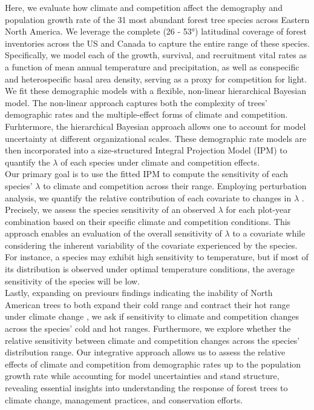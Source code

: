 Here, we evaluate how climate and competition affect the demography and
population growth rate of the 31 most abundant forest tree species
across Eastern North America. We leverage the complete (26 - 53°)
latitudinal coverage of forest inventories across the US and Canada to
capture the entire range of these species. Specifically, we model each
of the growth, survival, and recruitment vital rates as a function of
mean annual temperature and precipitation, as well as conspecific and
heterospecific basal area density, serving as a proxy for competition
for light. We fit these demographic models with a flexible, non-linear
hierarchical Bayesian model. The non-linear approach captures both the
complexity of trees' demographic rates and the multiple-effect forms of
climate and competition. Furhtermore, the hierarchical Bayesian approach
allows one to account for model uncertainty at different organizational
scales. These demographic rate models are then incorporated into a
size-structured Integral Projection Model (IPM) to quantify the
\(\lambda\) of each species under climate and competition effects.\\

Our primary goal is to use the fitted IPM to compute the sensitivity of
each species' \(\lambda\) to climate and competition across their range.
Employing perturbation analysis, we quantify the relative contribution
of each covariate to changes in \(\lambda\) \citep{Caswell2000}.
Precisely, we assess the species sensitivity of an observed \(\lambda\)
for each plot-year combination based on their specific climate and
competition conditions. This approach enables an evaluation of the
overall sensitivity of \(\lambda\) to a covariate while considering the
inherent variability of the covariate experienced by the species. For
instance, a species may exhibit high sensitivity to temperature, but if
most of its distribution is observed under optimal temperature
conditions, the average sensitivity of the species will be low.\\

Lastly, expanding on previours findings indicating the inability of
North American trees to both expand their cold range and contract their
hot range under climate change \citep{Talluto2017}, we ask if
sensitivity to climate and competition changes across the species' cold
and hot ranges. Furthermore, we explore whether the relative sensitivity
between climate and competition changes across the species' distribution
range. Our integrative approach allows us to assess the relative effects
of climate and competition from demographic rates up to the population
growth rate while accounting for model uncertainties and stand
structure, revealing essential insights into understanding the response
of forest trees to climate change, management practices, and
conservation efforts.\\

